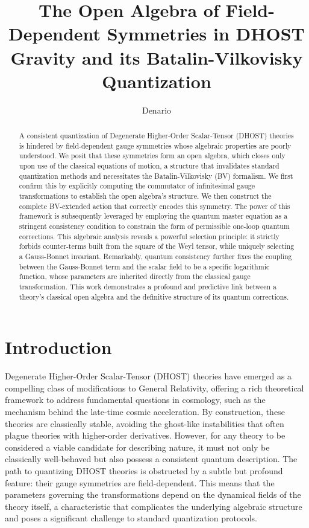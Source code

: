 \documentclass[twocolumn]{aastex631}
\begin{document}
\title{The Open Algebra of Field-Dependent Symmetries in DHOST Gravity and its Batalin-Vilkovisky Quantization}

\author{Denario}

\begin{abstract}
A consistent quantization of Degenerate Higher-Order Scalar-Tensor (DHOST) theories is hindered by field-dependent gauge symmetries whose algebraic properties are poorly understood. We posit that these symmetries form an open algebra, which closes only upon use of the classical equations of motion, a structure that invalidates standard quantization methods and necessitates the Batalin-Vilkovisky (BV) formalism. We first confirm this by explicitly computing the commutator of infinitesimal gauge transformations to establish the open algebra's structure. We then construct the complete BV-extended action that correctly encodes this symmetry. The power of this framework is subsequently leveraged by employing the quantum master equation as a stringent consistency condition to constrain the form of permissible one-loop quantum corrections. This algebraic analysis reveals a powerful selection principle: it strictly forbids counter-terms built from the square of the Weyl tensor, while uniquely selecting a Gauss-Bonnet invariant. Remarkably, quantum consistency further fixes the coupling between the Gauss-Bonnet term and the scalar field to be a specific logarithmic function, whose parameters are inherited directly from the classical gauge transformation. This work demonstrates a profound and predictive link between a theory's classical open algebra and the definitive structure of its quantum corrections.
\end{abstract}



\section{Introduction}
\label{sec:intro}

Degenerate Higher-Order Scalar-Tensor (DHOST) theories have emerged as a compelling class of modifications to General Relativity, offering a rich theoretical framework to address fundamental questions in cosmology, such as the mechanism behind the late-time cosmic acceleration. By construction, these theories are classically stable, avoiding the ghost-like instabilities that often plague theories with higher-order derivatives. However, for any theory to be considered a viable candidate for describing nature, it must not only be classically well-behaved but also possess a consistent quantum description. The path to quantizing DHOST theories is obstructed by a subtle but profound feature: their gauge symmetries are field-dependent. This means that the parameters governing the transformations depend on the dynamical fields of the theory itself, a characteristic that complicates the underlying algebraic structure and poses a significant challenge to standard quantization protocols.
\end{document}
